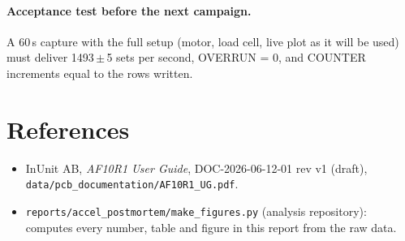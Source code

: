 \documentclass[11pt]{article}
\newcommand{\code}[1]{\texttt{#1}}
\begin{document}
\paragraph{Acceptance test before the next campaign.} A 60\,s capture with
the full setup (motor, load cell, live plot as it will be used) must deliver
1493\,$\pm$\,5 sets per second, OVERRUN = 0, and COUNTER increments equal to
the rows written.

\section*{References}

\begin{itemize}[nosep]
  \item InUnit AB, \emph{AF10R1 User Guide}, DOC-2026-06-12-01 rev v1 (draft),\\
        \code{data/pcb\_documentation/AF10R1\_UG.pdf}.
  \item \code{reports/accel\_postmortem/make\_figures.py} (analysis
        repository): computes every number, table and figure in this report
        from the raw data.
\end{itemize}
\end{document}
